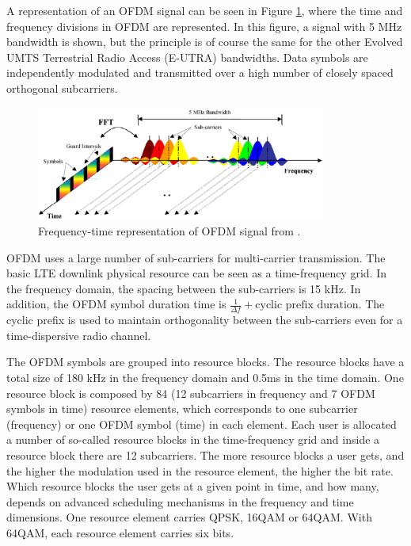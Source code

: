 A representation of an OFDM signal can be seen in Figure \ref{fig:ofdmfreq},
where the time and frequency divisions in OFDM are represented. In this figure,
a signal with 5 MHz bandwidth is shown, but the principle is of course the same
for the other Evolved UMTS Terrestrial Radio Access (E-UTRA) bandwidths. Data
symbols are independently modulated and transmitted over a high number of
closely spaced orthogonal subcarriers.

\begin{figure}[htbp]
    \centering
    \includegraphics[width=0.85\textwidth]{./figures/ofdm_frequency}
    \caption{ Frequency-time representation of OFDM signal from \cite{umtslte}.
    \label{fig:ofdmfreq}}
\end{figure}

OFDM uses a large number of sub-carriers for multi-carrier transmission. The
basic LTE downlink physical resource can be seen as a time-frequency grid. In
the frequency domain, the spacing between the sub-carriers is 15 kHz. In
addition, the OFDM symbol duration time is $\frac{1}{\Delta f} + \text{cyclic
prefix duration}$. The cyclic prefix is used to maintain orthogonality between
the sub-carriers even for a time-dispersive radio channel.

The OFDM symbols are grouped into resource blocks. The resource blocks have a
total size of 180 kHz in the frequency domain and 0.5ms in the time domain. One
resource block is composed by 84 (12 subcarriers in frequency and 7 OFDM symbols
in time) resource elements, which corresponds to one subcarrier (frequency) or
one OFDM symbol (time) in each element. Each user is allocated a number of
so-called resource blocks in the time-frequency grid and inside a resource block
there are 12 subcarriers. The more resource blocks a user gets, and the higher
the modulation used in the resource element, the higher the bit rate. Which
resource blocks the user gets at a given point in time, and how many, depends on
advanced scheduling mechanisms in the frequency and time dimensions. One
resource element carries QPSK, 16QAM or 64QAM. With 64QAM, each resource element
carries six bits.

